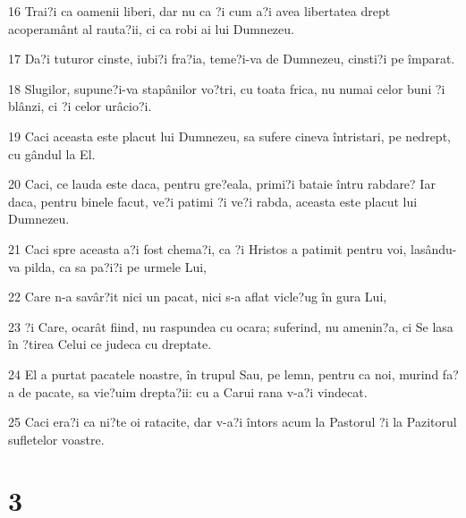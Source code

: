 \par 16 Trai?i ca oamenii liberi, dar nu ca ?i cum a?i avea libertatea drept acoperamânt al rauta?ii, ci ca robi ai lui Dumnezeu.
\par 17 Da?i tuturor cinste, iubi?i fra?ia, teme?i-va de Dumnezeu, cinsti?i pe împarat.
\par 18 Slugilor, supune?i-va stapânilor vo?tri, cu toata frica, nu numai celor buni ?i blânzi, ci ?i celor urâcio?i.
\par 19 Caci aceasta este placut lui Dumnezeu, sa sufere cineva întristari, pe nedrept, cu gândul la El.
\par 20 Caci, ce lauda este daca, pentru gre?eala, primi?i bataie întru rabdare? Iar daca, pentru binele facut, ve?i patimi ?i ve?i rabda, aceasta este placut lui Dumnezeu.
\par 21 Caci spre aceasta a?i fost chema?i, ca ?i Hristos a patimit pentru voi, lasându-va pilda, ca sa pa?i?i pe urmele Lui,
\par 22 Care n-a savâr?it nici un pacat, nici s-a aflat vicle?ug în gura Lui,
\par 23 ?i Care, ocarât fiind, nu raspundea cu ocara; suferind, nu amenin?a, ci Se lasa în ?tirea Celui ce judeca cu dreptate.
\par 24 El a purtat pacatele noastre, în trupul Sau, pe lemn, pentru ca noi, murind fa?a de pacate, sa vie?uim drepta?ii: cu a Carui rana v-a?i vindecat.
\par 25 Caci era?i ca ni?te oi ratacite, dar v-a?i întors acum la Pastorul ?i la Pazitorul sufletelor voastre.

\chapter{3}

